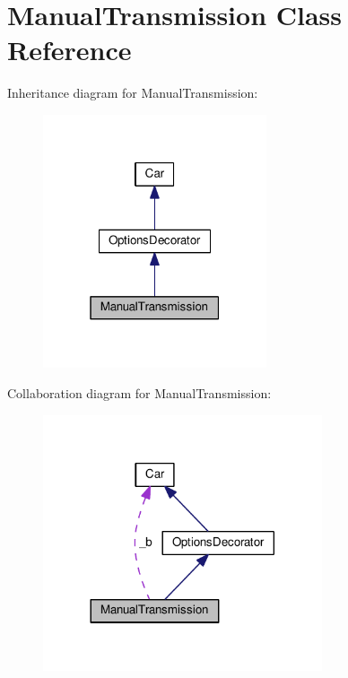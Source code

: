 \hypertarget{classManualTransmission}{}\section{Manual\+Transmission Class Reference}
\label{classManualTransmission}


Inheritance diagram for Manual\+Transmission\+:
\nopagebreak
\begin{figure}[H]
\begin{center}
\leavevmode
\includegraphics[width=187pt]{classManualTransmission__inherit__graph}
\end{center}
\end{figure}


Collaboration diagram for Manual\+Transmission\+:
\nopagebreak
\begin{figure}[H]
\begin{center}
\leavevmode
\includegraphics[width=233pt]{classManualTransmission__coll__graph}
\end{center}
\end{figure}
